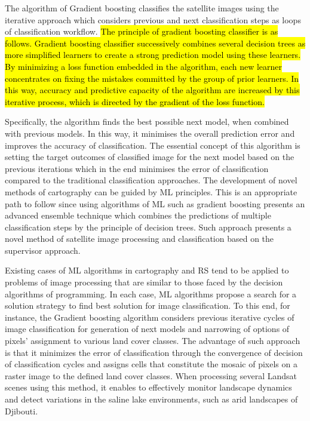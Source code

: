 \documentclass[jimaging,article,submit,pdftex,moreauthors]{Definitions/mdpi}
\begin{document}
The algorithm of Gradient boosting classifies the satellite images using the iterative approach which considers previous and next classification steps as loops of classification workflow. \hl{The principle of gradient boosting classifier is as follows. Gradient boosting classifier successively combines several decision trees as more simplified learners to create a strong prediction model using these learners.  By minimizing a loss function embedded in the algorithm, each new learner concentrates on fixing the mistakes committed by the group of prior learners. In this way, accuracy and predictive capacity of the algorithm are increased by this iterative process, which is directed by the gradient of the loss function.}

Specifically, the algorithm finds the best possible next model, when combined with previous models. In this way, it minimises the overall prediction error and improves the accuracy of classification. The essential concept of this algorithm is setting the target outcomes of classified image for the next model based on the previous iterations which in the end minimises the error of classification compared to the traditional classification approaches. The development of novel methods of cartography can be guided by ML principles. This is an appropriate path to follow since using algorithms of ML such as gradient boosting presents an advanced ensemble technique which combines the predictions of multiple classification steps by the principle of decision trees. Such approach presents a novel method of satellite image processing and classification based on the supervisor approach. 

Existing cases of ML algorithms in cartography and RS tend to be applied to problems of image processing that are similar to those faced by the decision algorithms of programming. In each case, ML algorithms propose a search for a solution strategy to find best solution for image classification. To this end, for instance, the Gradient boosting algorithm considers previous iterative cycles of image classification for generation of next models and narrowing of options of pixels' assignment to various land cover classes. The advantage of such approach is that it minimizes the error of classification through the convergence of decision of classification cycles and assigns cells that constitute the mosaic of pixels on a raster image to the defined land cover classes. When processing several Landsat scenes using this method, it enables to effectively monitor landscape dynamics and detect variations in the saline lake environments, such as arid landscapes of Djibouti. 
\end{document}
